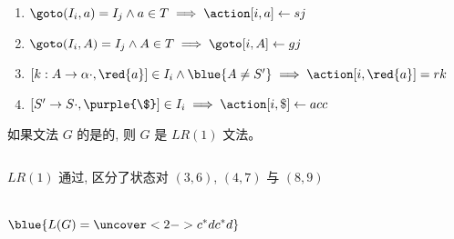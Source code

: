 \begin{frame}{}
  \begin{center}

    \vspace{0.60cm}
    \begin{enumerate}[(1)]
      \setlength{\itemsep}{25pt}
      \item $\goto(I_{i}, a) = I_{j} \land a \in T \implies \action[i, a] \gets sj$
      \item $\goto(I_{i}, A) = I_{j} \land A \in T \implies \goto[i, A] \gets gj$
      \item $[k: A \to \alpha \cdot, \red{a}] \in I_{i} \land \blue{A \neq S'} \implies
        \action[i, \red{a}] = rk$
      \item $[S' \to S \cdot, \purple{\$}] \in I_{i} \implies \action[i, \$] \gets acc$
    \end{enumerate}

    \pause
    \vspace{0.20cm}
    \begin{definition}[$LR(1)$文法]
      如果文法 $G$ 的是的,
      则 $G$ 是 $LR(1)$ 文法。
    \end{definition}
  \end{center}
\end{frame}

\begin{frame}{}
  \begin{center}
    \begin{columns}
    \end{columns}

    \vspace{0.60cm}
    $LR(1)$ 通过, 区分了状态对 $(3, 6)$, $(4, 7)$ 与 $(8, 9)$
  \end{center}
\end{frame}

\begin{frame}{}
  \begin{center}

    \begin{columns}

        \[
          \blue{L(G) = \uncover<2->{c^{\ast}dc^{\ast}d}}
        \]
    \end{columns}
  \end{center}
\end{frame}

